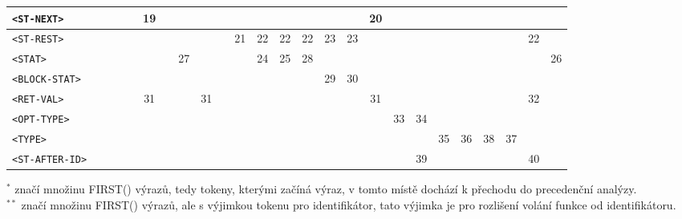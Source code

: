 \documentclass[12pt, a4paper]{article}
\begin{document}
{\begin{table}[H]
{\begin{tabular}{|l|*{24}{c|}}
\texttt{<ST-NEXT>}     &   &   &   &   & 19 &    &    &    &    &    &    &    &    &    &    & 20 &    &    &    &    &    &    &    &    \\ \hline
\texttt{<ST-REST>}     &   &   &   &   &    &    &    &    &    & 21 & 22 & 22 & 22 & 23 & 23 &    &    &    &    &    &    &    & 22 &    \\ \hline
\texttt{<STAT>}        &   &   &   &   &    &    & 27 &    &    &    & 24 & 25 & 28 &    &    &    &    &    &    &    &    &    &    & 26 \\ \hline
\texttt{<BLOCK-STAT>}  &   &   &   &   &    &    &    &    &    &    &    &    &    & 29 & 30 &    &    &    &    &    &    &    &    &    \\ \hline
\texttt{<RET-VAL>}     &   &   &   &   & 31 &    &    & 31 &    &    &    &    &    &    &    & 31 &    &    &    &    &    &    & 32 &    \\ \hline
\texttt{<OPT-TYPE>}    &   &   &   &   &    &    &    &    &    &    &    &    &    &    &    &    & 33 & 34 &    &    &    &    &    &    \\ \hline
\texttt{<TYPE>}        &   &   &   &   &    &    &    &    &    &    &    &    &    &    &    &    &    &    & 35 & 36 & 38 & 37 &    &    \\ \hline
\texttt{<ST-AFTER-ID>} &   &   &   &   &    &    &    &    &    &    &    &    &    &    &    &    &    & 39 &    &    &    &    & 40 &    \\ \hline
\end{tabular}%
}
\vspace{4pt}
\begin{flushleft}
\footnotesize
$^*$ značí množinu FIRST() výrazů, tedy tokeny, kterými začíná výraz, v tomto místě dochází k přechodu do precedenční analýzy. \\
$^{**}$ značí množinu FIRST() výrazů, ale s výjimkou tokenu pro identifikátor, tato výjimka je pro rozlišení volání funkce od identifikátoru.
\end{flushleft}
\end{table}
}
\newpage
\end{document}
